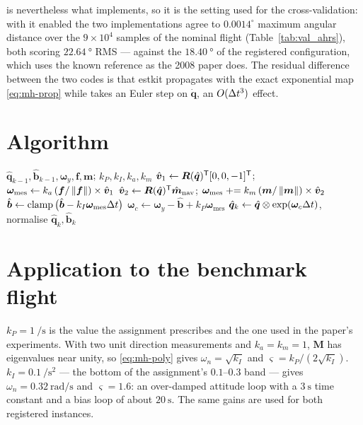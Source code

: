  is nevertheless what  implements, so it is the
setting used for the cross-validation: with it enabled the two implementations agree to
$0.0014^\circ$ maximum angular distance over the $9\times10^4$ samples of the nominal flight
(Table~\ref{tab:val_ahrs}), both scoring $\SI{22.64}{\degree}$ RMS --- against the
$\SI{18.40}{\degree}$ of the registered configuration, which uses the known reference as the 2008
paper does. The residual difference between the two codes is that estkit propagates with the exact
exponential map \eqref{eq:mh-prop} while  takes an Euler step on $\dot{\bm{q}}$, an
$O(\Delta t^3)$ effect.

\section{Algorithm}
\begin{algorithm}[H]
\caption{Mahony explicit complementary filter --- one sampling period}
\begin{algorithmic}[1]
\Require $\hat{\bm{q}}_{k-1},\hat{\bm{b}}_{k-1},\bm{\omega}_y,\bm{f},\bm{m}$; $k_P,k_I,k_a,k_m$
\State $\hat{\bm{v}}_1\gets\bm{R}(\hat{\bm{q}})^{\mathsf{T}}[0,0,-1]^{\mathsf{T}}$;\;
       $\bm{\omega}_{\text{mes}}\gets k_a\,(\bm{f}/\left\lVert \bm{f} \right\rVert)\times\hat{\bm{v}}_1$
\State $\hat{\bm{v}}_2\gets\bm{R}(\hat{\bm{q}})^{\mathsf{T}}\hat{\bm{m}}_{\text{nav}}$;\;
       $\bm{\omega}_{\text{mes}}\mathrel{+}= k_m\,(\bm{m}/\left\lVert \bm{m} \right\rVert)\times\hat{\bm{v}}_2$
\State $\hat{\bm{b}}\gets\operatorname{clamp}\big(\hat{\bm{b}}-k_I\bm{\omega}_{\text{mes}}\Delta t\big)$
\State $\bm{\omega}_c\gets\bm{\omega}_y-\hat{\bm{b}}+k_P\bm{\omega}_{\text{mes}}$
\State $\hat{\bm{q}}_k\gets\hat{\bm{q}}\otimes\exp(\bm{\omega}_c\Delta t)$, normalise
\Ensure $\hat{\bm{q}}_k,\hat{\bm{b}}_k$
\end{algorithmic}
\end{algorithm}

\section{Application to the benchmark flight}
$k_P=\SI{1}{\per\second}$ is the value the assignment prescribes and the one used in the paper's
experiments. With two unit direction measurements and $k_a=k_m=1$, $\bm{M}$ has eigenvalues near
unity, so \eqref{eq:mh-poly} gives $\omega_n=\sqrt{k_I}$ and $\varsigma=k_P/(2\sqrt{k_I})$.
$k_I=\SI{0.1}{\per\second\squared}$ --- the bottom of the assignment's $0.1$--$0.3$ band --- gives
$\omega_n=\SI{0.32}{\radian\per\second}$ and $\varsigma=1.6$: an over-damped attitude loop with a
$\SI{3}{\second}$ time constant and a bias loop of about $\SI{20}{\second}$. The same gains are used
for both registered instances.

